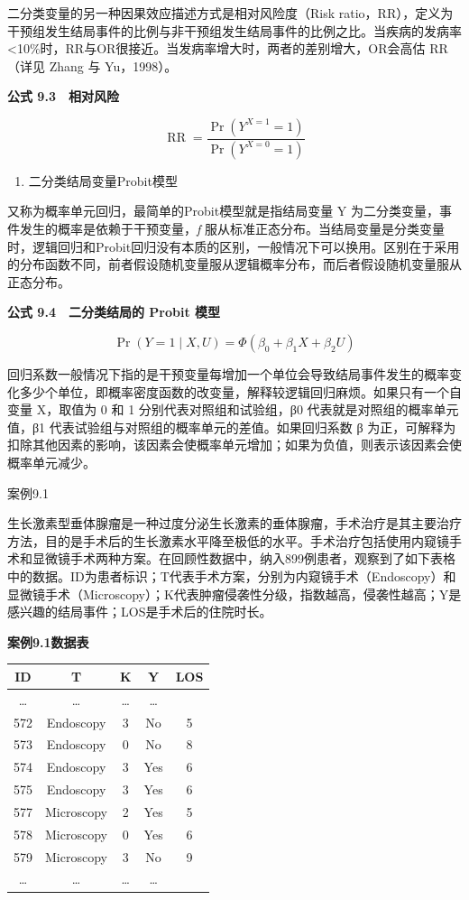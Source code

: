\documentclass[
  chinese-hans,
  letterpaper,
  DIV=11,
  numbers=noendperiod]{scrreprt}
\newcounter{none} %
\providecommand{\tightlist}{%
  \setlength{\itemsep}{0pt}\setlength{\parskip}{0pt}}
\begin{document}
二分类变量的另一种因果效应描述方式是相对风险度（Risk
ratio，RR），定义为干预组发生结局事件的比例与非干预组发生结局事件的比例之比。当疾病的发病率\textless10\%时，RR与OR很接近。当发病率增大时，两者的差别增大，OR会高估
RR（详见 Zhang 与 Yu，1998）。

\textbf{公式 9.3　相对风险}

\[\operatorname{RR} = \frac{\Pr(Y^{X=1}=1)}{\Pr(Y^{X=0}=1)}\]

\begin{enumerate}
\def\labelenumi{\arabic{enumi}.}
\setcounter{enumi}{2}
\tightlist
\item
  二分类结局变量Probit模型
\end{enumerate}

又称为概率单元回归，最简单的Probit模型就是指结局变量 Y
为二分类变量，事件发生的概率是依赖于干预变量，\emph{f}
服从标准正态分布。当结局变量是分类变量时，逻辑回归和Probit回归没有本质的区别，一般情况下可以换用。区别在于采用的分布函数不同，前者假设随机变量服从逻辑概率分布，而后者假设随机变量服从正态分布。

\textbf{公式 9.4　二分类结局的 Probit 模型}

\[\Pr(Y=1\mid X,U) = \Phi(\beta_0+\beta_1X+\beta_2U)\]

回归系数一般情况下指的是干预变量每增加一个单位会导致结局事件发生的概率变化多少个单位，即概率密度函数的改变量，解释较逻辑回归麻烦。如果只有一个自变量
X，取值为 0 和 1 分别代表对照组和试验组，β0
代表就是对照组的概率单元值，β1
代表试验组与对照组的概率单元的差值。如果回归系数 β
为正，可解释为扣除其他因素的影响，该因素会使概率单元增加；如果为负值，则表示该因素会使概率单元减少。

案例9.1

生长激素型垂体腺瘤是一种过度分泌生长激素的垂体腺瘤，手术治疗是其主要治疗方法，目的是手术后的生长激素水平降至极低的水平。手术治疗包括使用内窥镜手术和显微镜手术两种方案。在回顾性数据中，纳入899例患者，观察到了如下表格中的数据。ID为患者标识；T代表手术方案，分别为内窥镜手术（Endoscopy）和显微镜手术（Microscopy）；K代表肿瘤侵袭性分级，指数越高，侵袭性越高；Y是感兴趣的结局事件；LOS是手术后的住院时长。

\textbf{案例9.1数据表}

{\def\LTcaptype{none} %
\begin{longtable}[]{@{}ccccc@{}}
\toprule\noalign{}
ID & T & K & Y & LOS \\
\midrule\noalign{}
\endhead
\bottomrule\noalign{}
\endlastfoot
\ldots{} & \ldots{} & \ldots{} & \ldots{} & \\
572 & Endoscopy & 3 & No & 5 \\
573 & Endoscopy & 0 & No & 8 \\
574 & Endoscopy & 3 & Yes & 6 \\
575 & Endoscopy & 3 & Yes & 6 \\
577 & Microscopy & 2 & Yes & 5 \\
578 & Microscopy & 0 & Yes & 6 \\
579 & Microscopy & 3 & No & 9 \\
\ldots{} & \ldots{} & \ldots{} & \ldots{} & \\
\end{longtable}
}
\end{document}
